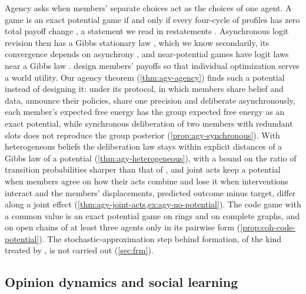 Agency asks when members' separate choices act as the choices of one agent. A game is an exact potential game if and only if every four-cycle of profiles has zero total payoff change \citep[Theorem~2.8]{monderer1996potential}, a statement we read in restatements \citep{arefizadeh2024characterizations}. Asynchronous logit revision then has a Gibbs stationary law \citep{blume1993statistical}, which we know secondarily, its convergence depends on asynchrony \citep{alosferrer2010logit}, and near-potential games have logit laws near a Gibbs law \citep{candogan2013dynamics}. \citet{wolpert2001optimal} design members' payoffs so that individual optimization serves a world utility. Our agency theorem (\cref{thm:agy-agency}) finds such a potential instead of designing it: under its protocol, in which members share belief and data, announce their policies, share one precision and deliberate asynchronously, each member's expected free energy has the group expected free energy as an exact potential, while synchronous deliberation of two members with redundant slots does not reproduce the group posterior (\cref{prop:agy-synchronous}). With heterogeneous beliefs the deliberation law stays within explicit distances of a Gibbs law of a potential (\cref{thm:agy-heterogeneous}), with a bound on the ratio of transition probabilities sharper than that of \citet{candogan2013dynamics}, and joint acts keep a potential when members agree on how their acts combine and lose it when interventions interact and the members' displacements, predicted outcome minus target, differ along a joint effect (\cref{thm:agy-joint-acts,ex:agy-no-potential}). The code game with a common value is an exact potential game on rings and on complete graphs, and on open chains of at least three agents only in its pairwise form (\cref{prop:coh-code-potential}). The stochastic-approximation step behind formation, of the kind treated by \citet{benaim1999dynamics}, is not carried out (\cref{sec:frm}).

\subsection{Opinion dynamics and social learning}\label{sec:rel-opinion}

